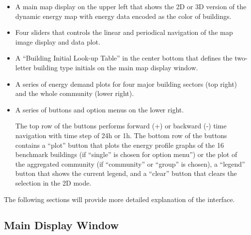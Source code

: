\begin{itemize}
\item A main map display on the upper left that shows the 2D or 3D
  version of the dynamic energy map with energy data encoded as the
  color of buildings. 

\item Four sliders that controls the linear and periodical navigation
  of the map image display and data plot.

\item A ``Building Initial Look-up Table'' in the center bottom that
  defines the two-letter building type initials on the main map
  display window.
\item A series of energy demand plots for four major building sectors
  (top right) and the whole community (lower right).  
\item A series of buttons and option menus on the lower right. 

  The top row of the buttons performs forward (+) or backward (-) time
  navigation with time step of 24h or 1h. The bottom row of the
  buttons contains a ``plot'' button that plots the energy profile
  graphs of the 16 benchmark buildings (if ``single'' is chosen for
  option menu'') or the plot of the aggregated community (if
  ``community'' or ``group'' is chosen), a ``legend'' button that
  shows the current legend, and a ``clear'' button that clears the
  selection in the 2D mode.
\end{itemize}

The following sections will provide more detailed explanation of the
interface.

\subsection {Main Display Window} \label{2d3d} 

